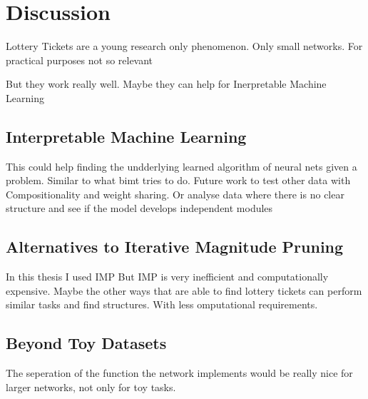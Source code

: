 \chapter{Discussion}
Lottery Tickets are a young research only phenomenon.
Only small networks.
For practical purposes not so relevant

But they work really well.
Maybe they can help for Inerpretable Machine Learning

\section{Interpretable Machine Learning }
This could help finding the undderlying learned algorithm of neural nets given a problem.
Similar to what bimt tries to do.
Future work to test other data with Compositionality and weight sharing.
Or analyse data where there is no clear structure and see if the model develops independent modules

\section{Alternatives to Iterative Magnitude Pruning}
In this thesis I used IMP
But IMP is very inefficient and computationally expensive.
Maybe the other ways that are able to find lottery tickets can perform similar tasks and find structures.
With less omputational requirements.

\section{Beyond Toy Datasets}
The seperation of the function the network implements would be really nice for larger networks, not only for toy tasks.
